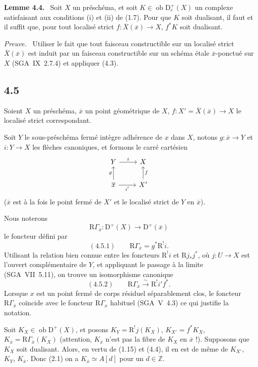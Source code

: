 \documentclass[11pt]{article}
\newenvironment{statement}[1]{\par\medskip\noindent\textbf{#1.}\ }{\par\medskip}
\newenvironment{prooftext}[1][Proof]{\par\noindent\emph{#1.}\ }{\par\medskip}
\newcommand{\R}{\mathrm{R}}
\newcommand{\D}{\mathrm{D}}
\newcommand{\Z}{\mathbb{Z}}
\newcommand{\ob}{\operatorname{ob}}
\newcommand{\ol}[1]{\overline{#1}}
\providecommand{\ob}{\operatorname{ob}}
\begin{document}
\begin{statement}{Lemme 4.4}
Soit $X$ un préschéma, et soit $K\in\ob\D_c^+(X)$ un complexe satisfaisant aux conditions (i) et (ii) de (1.7). Pour que $K$ soit dualisant, il faut et il suffit que, pour tout localisé strict $f:\ol{X}(\ol{x})\to X$, $f^*K$ soit dualisant.
\end{statement}

\begin{prooftext}[Preuve]
Utiliser le fait que tout faisceau constructible sur un localisé strict $\ol{X}(\ol{x})$ est induit par un faisceau constructible sur un schéma étale $\ol{x}$-ponctué sur $X$ (SGA~IX~2.7.4) et appliquer (4.3).
\end{prooftext}

\subsection*{4.5}
Soient $X$ un préschéma, $\ol{x}$ un point géométrique de $X$, $f:X'=\ol{X}(\ol{x})\to X$ le localisé strict correspondant.

Soit $Y$ le sous-préschéma fermé intègre adhérence de $x$ dans $X$, notons $g:\ol{x}\to Y$ et $i:Y\to X$ les flèches canoniques, et formons le carré cartésien
\[
\begin{tikzcd}
Y \arrow[r,"i"] & X \\
\ol{x} \arrow[u,"g"] \arrow[r,"i'"'] & X' \arrow[u,"f"']
\end{tikzcd}
\]
($\ol{x}$ est à la fois le point fermé de $X'$ et le localisé strict de $Y$ en $\ol{x}$).

Nous noterons
\[
\R\Gamma_{\ol{x}}:\D^+(X)\longrightarrow \D^+(\ol{x})
\]
le foncteur défini par
\[
(4.5.1)\qquad \R\Gamma_{\ol{x}}=g^*\R^{!}i.
\]
Utilisant la relation bien connue entre les foncteurs $\R^{!}i$ et $\R j_*j^*$, où $j:U\to X$ est l'ouvert complémentaire de $Y$, et appliquant le passage à la limite (SGA~VII~5.11), on trouve un isomorphisme canonique
\[
(4.5.2)\qquad \R\Gamma_{\ol{x}}\xrightarrow{\sim}\R^{!}i' f^*.
\]
Lorsque $x$ est un point fermé de corps résiduel séparablement clos, le foncteur $\R\Gamma_{\ol{x}}$ coïncide avec le foncteur $\R\Gamma_x$ habituel (SGA~V~4.3) ce qui justifie la notation.

Soit $K_X\in\ob\D^+(X)$, et posons $K_Y=\R^{!}j(K_X)$, $K_{X'}=f^*K_X$, $K_{\ol{x}}=\R\Gamma_{\ol{x}}(K_X)$ (attention, $K_{\ol{x}}$ n'est pas la fibre de $K_X$ en $\ol{x}$ !). Supposons que $K_X$ soit dualisant. Alors, en vertu de (1.15) et (4.4), il en est de même de $K_{X'}$, $K_Y$, $K_{\ol{x}}$. Donc (2.1) on a $K_{\ol{x}}\simeq A[d]$ pour un $d\in\Z$.
\end{document}
